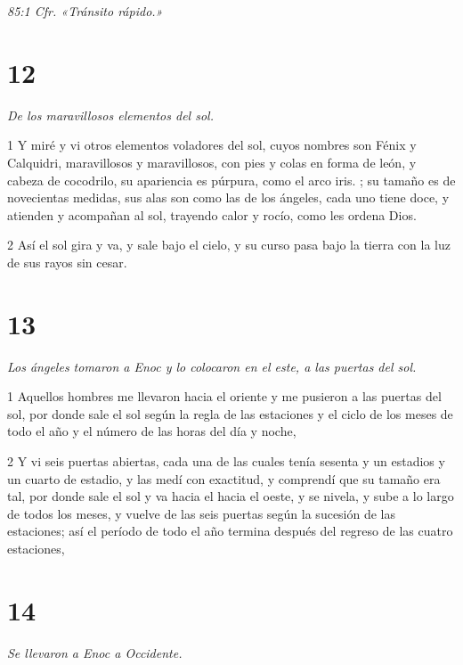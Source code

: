 \par \textit{85:1 Cfr. «Tránsito rápido.»}

\chapter{12}

\par \textit{De los maravillosos elementos del sol.}

\par 1 Y miré y vi otros elementos voladores del sol, cuyos nombres son Fénix y Calquidri, maravillosos y maravillosos, con pies y colas en forma de león, y cabeza de cocodrilo, su apariencia es púrpura, como el arco iris. ; su tamaño es de novecientas medidas, sus alas son como las de los ángeles, cada uno tiene doce, y atienden y acompañan al sol, trayendo calor y rocío, como les ordena Dios.

\par 2 Así el sol gira y va, y sale bajo el cielo, y su curso pasa bajo la tierra con la luz de sus rayos sin cesar.

\chapter{13}

\par \textit{Los ángeles tomaron a Enoc y lo colocaron en el este, a las puertas del sol.}

\par 1 Aquellos hombres me llevaron hacia el oriente y me pusieron a las puertas del sol, por donde sale el sol según la regla de las estaciones y el ciclo de los meses de todo el año y el número de las horas del día y noche,

\par 2 Y vi seis puertas abiertas, cada una de las cuales tenía sesenta y un estadios y un cuarto de estadio, y las medí con exactitud, y comprendí que su tamaño era tal, por donde sale el sol y va hacia el hacia el oeste, y se nivela, y sube a lo largo de todos los meses, y vuelve de las seis puertas según la sucesión de las estaciones; así el período de todo el año termina después del regreso de las cuatro estaciones,

\chapter{14}

\par \textit{Se llevaron a Enoc a Occidente.}

